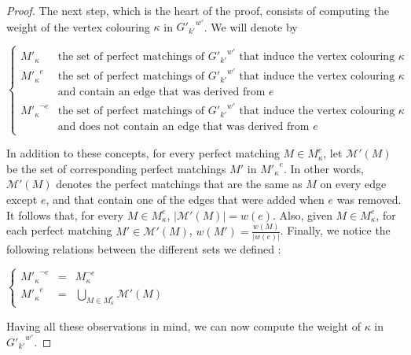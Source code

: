 \begin{proof}
    The next step, which is the heart of the proof, consists of computing the weight of the vertex colouring $\kappa$ in ${G'_{k'}}^{w'}$.
    We will denote by

    \begin{center}
        $\left\{
            \begin{array}{ll}
                M'_{\kappa}            & \mbox{the set of perfect matchings of } {G'_{k'}}^{w'} \mbox{ that induce the vertex colouring } \kappa \\
                {M'_{\kappa}}^e        & \mbox{the set of perfect matchings of } {G'_{k'}}^{w'} \mbox{ that induce the vertex colouring } \kappa \\
                                   & \mbox{and contain an edge that was derived from } e \\
                {M'_{\kappa}}^{\neg e} & \mbox{the set of perfect matchings of } {G'_{k'}}^{w'} \mbox{ that induce the vertex colouring } \kappa \\
                                   & \mbox{and does not contain an edge that was derived from } e
            \end{array}
        \right.$
    \end{center}

    In addition to these concepts, for every perfect matching $M \in M_{\kappa}^e$, let $\mathcal{M}'(M)$ be the set of corresponding perfect matchings $M'$ in ${M'_{\kappa}}^e$.
    In other words, $\mathcal{M}'(M)$ denotes the perfect matchings that are the same as $M$ on every edge except $e$, and that contain one of the edges that were added when $e$ was removed.
    It follows that, for every $M \in M_{\kappa}^e$, $|\mathcal{M}'(M)| = w(e)$.
    Also, given $M \in M_{\kappa}^e$, for each perfect matching $M' \in \mathcal{M}'(M)$, $w(M') = \frac{w(M)}{|w(e)|}$.
    Finally, we notice the following relations between the different sets we defined :

    \begin{center}
        $\left\{
            \begin{array}{lcl}
                {M'_{\kappa}}^{\neg e} & = & M_{\kappa}^{\neg e} \\
                {M'_{\kappa}}^e        & = & \bigcup\limits_{M \in M_{\kappa}^e} \mathcal{M}'(M)
            \end{array}
        \right.$
    \end{center}

    Having all these observations in mind, we can now compute the weight of $\kappa$ in ${G'_{k'}}^{w'}$.


\end{proof}
